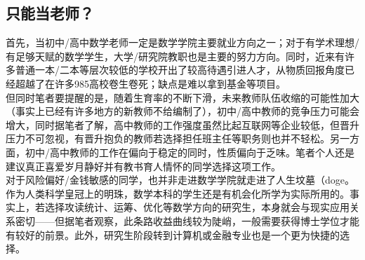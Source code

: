 \documentclass[a4paper,11pt,notitlepage]{article}
\begin{document}
\subsection{只能当老师？}
首先，当初中/高中数学老师一定是数学学院主要就业方向之一；对于有学术理想/有足够天赋的数学学生，大学/研究院教职也是主要的努力方向。同时，近来有许多普通一本/二本等层次较低的学校开出了较高待遇引进人才，从物质回报角度已经超越了在许多985高校卷生卷死；缺点是难以拿到基金等项目。\\
\indent 但同时笔者要提醒的是，随着生育率的不断下滑，未来教师队伍收缩的可能性加大（事实上已经有许多地方的新教师不给编制了），初中/高中教师的竞争压力可能会增大，同时据笔者了解，高中教师的工作强度虽然比起互联网等企业较低，但晋升压力不可忽视，有晋升抱负的教师若选择担任班主任等职务则也并不轻松。另一方面，初中/高中教师的工作在偏向于稳定的同时，性质偏向于乏味。笔者个人还是建议真正喜爱岁月静好并有教书育人情怀的同学选择这项工作。\\
\indent 对于风险偏好/金钱敏感的同学，也并非走进数学学院就走进了人生坟墓（doge。作为人类科学皇冠上的明珠，数学本科的学生还是有机会化所学为实际所用的。事实上，若选择攻读统计、运筹、优化等数学方向的研究生，本身就会与现实应用关系密切——但据笔者观察，此条路收益曲线较为陡峭，一般需要获得博士学位才能有较好的前景。此外，研究生阶段转到计算机或金融专业也是一个更为快捷的选择。
\end{document}

